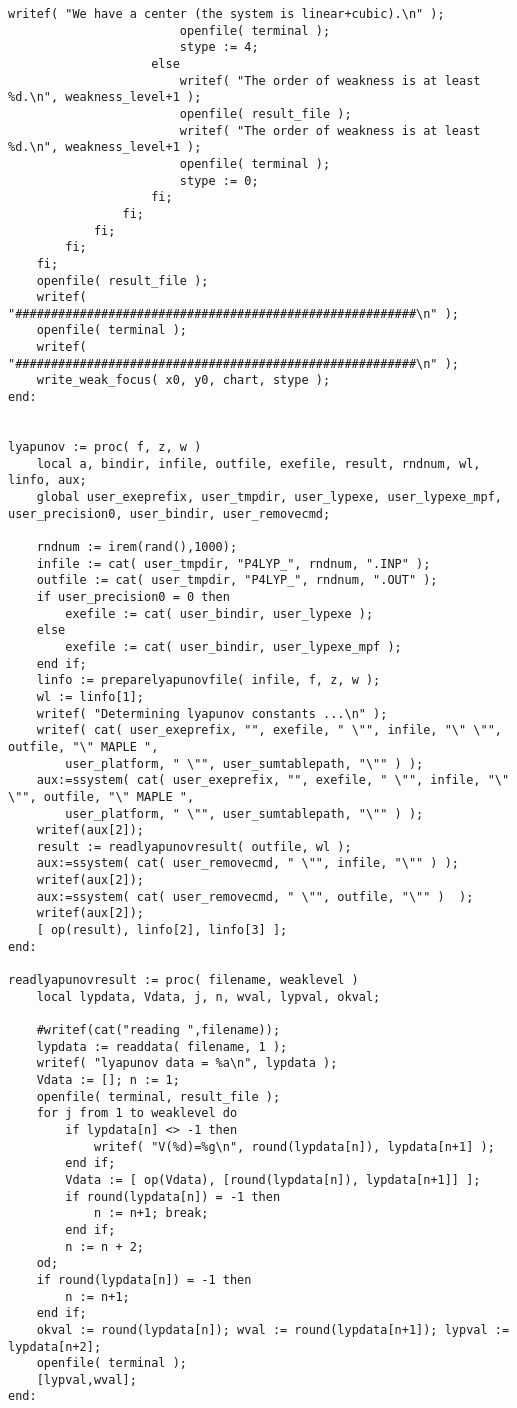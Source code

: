 \documentclass[a4paper,10pt]{article}
\begin{document}
\begin{lstlisting}[name=weakfocus]
                        writef( "We have a center (the system is linear+cubic).\n" );
                        openfile( terminal );
                        stype := 4;
                    else
                        writef( "The order of weakness is at least %d.\n", weakness_level+1 );
                        openfile( result_file );
                        writef( "The order of weakness is at least %d.\n", weakness_level+1 );
                        openfile( terminal );
                        stype := 0;
                    fi;
                fi;
            fi;
        fi;
    fi;
    openfile( result_file );
    writef( "########################################################\n" );
    openfile( terminal );
    writef( "########################################################\n" );
    write_weak_focus( x0, y0, chart, stype );
end:


lyapunov := proc( f, z, w )
    local a, bindir, infile, outfile, exefile, result, rndnum, wl, linfo, aux;
    global user_exeprefix, user_tmpdir, user_lypexe, user_lypexe_mpf, user_precision0, user_bindir, user_removecmd;

    rndnum := irem(rand(),1000);
    infile := cat( user_tmpdir, "P4LYP_", rndnum, ".INP" );
    outfile := cat( user_tmpdir, "P4LYP_", rndnum, ".OUT" );
    if user_precision0 = 0 then
        exefile := cat( user_bindir, user_lypexe );
    else
        exefile := cat( user_bindir, user_lypexe_mpf );
    end if;
    linfo := preparelyapunovfile( infile, f, z, w );
    wl := linfo[1];
    writef( "Determining lyapunov constants ...\n" );
    writef( cat( user_exeprefix, "", exefile, " \"", infile, "\" \"", outfile, "\" MAPLE ",
        user_platform, " \"", user_sumtablepath, "\"" ) );
    aux:=ssystem( cat( user_exeprefix, "", exefile, " \"", infile, "\" \"", outfile, "\" MAPLE ",
        user_platform, " \"", user_sumtablepath, "\"" ) );
    writef(aux[2]);
    result := readlyapunovresult( outfile, wl );
    aux:=ssystem( cat( user_removecmd, " \"", infile, "\"" ) );
    writef(aux[2]);
    aux:=ssystem( cat( user_removecmd, " \"", outfile, "\"" )  );
    writef(aux[2]);
    [ op(result), linfo[2], linfo[3] ];
end:

readlyapunovresult := proc( filename, weaklevel )
    local lypdata, Vdata, j, n, wval, lypval, okval;

    #writef(cat("reading ",filename));
    lypdata := readdata( filename, 1 );
    writef( "lyapunov data = %a\n", lypdata );
    Vdata := []; n := 1;
    openfile( terminal, result_file );
    for j from 1 to weaklevel do
        if lypdata[n] <> -1 then
            writef( "V(%d)=%g\n", round(lypdata[n]), lypdata[n+1] );
        end if;
        Vdata := [ op(Vdata), [round(lypdata[n]), lypdata[n+1]] ];
        if round(lypdata[n]) = -1 then
            n := n+1; break;
        end if;
        n := n + 2;
    od;
    if round(lypdata[n]) = -1 then
        n := n+1;
    end if;
    okval := round(lypdata[n]); wval := round(lypdata[n+1]); lypval := lypdata[n+2];
    openfile( terminal );
    [lypval,wval];
end:


\end{lstlisting}
\end{document}
